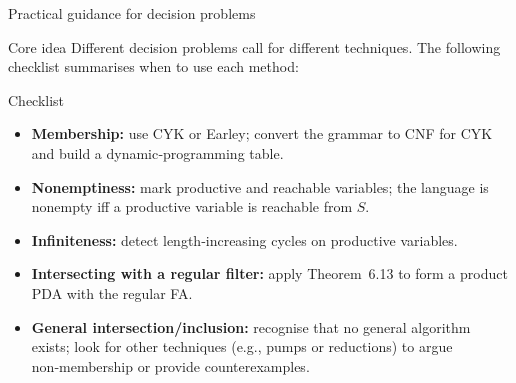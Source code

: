 \begin{frame}[t]{Practical guidance for decision problems}
  \begin{tblock}{Core idea}
    Different decision problems call for different techniques.  The
    following checklist summarises when to use each method:
  \end{tblock}
  \begin{tblock}{Checklist}
    \begin{itemize}
      \item \textbf{Membership:} use CYK or Earley; convert the grammar
        to CNF for CYK and build a dynamic‑programming table.
      \item \textbf{Nonemptiness:} mark productive and reachable
        variables; the language is nonempty iff a productive variable is
        reachable from $S$.
      \item \textbf{Infiniteness:} detect length‑increasing cycles on
        productive variables.
      \item \textbf{Intersecting with a regular filter:} apply
        Theorem 6.13 to form a product PDA with the regular FA.
      \item \textbf{General intersection/inclusion:} recognise that no
        general algorithm exists; look for other techniques (e.g., pumps
        or reductions) to argue non‑membership or provide counterexamples.
    \end{itemize}
  \end{tblock}
  \label{fr:6.3-10}
\end{frame}

